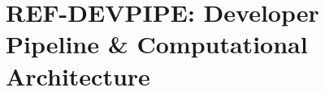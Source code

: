 %
%
%
%

\chapter{REF-DEVPIPE: Developer Pipeline \& Computational Architecture}
\label{app:ref-devpipe}

\begin{abstract}
This appendix provides a comprehensive guide for developers implementing the
Evidence-Based Framework (EBF). It answers the fundamental questions: What is
a ``result'' in EBF? How do the components connect computationally? What is
the data flow from input to output? The appendix documents the complete
computational pipeline, database architecture, script inventory, and provides
concrete implementation workflows. While Appendix UNMAPPED_FM shows where proofs are,
this appendix shows how to \textit{compute} results.
\end{abstract}


